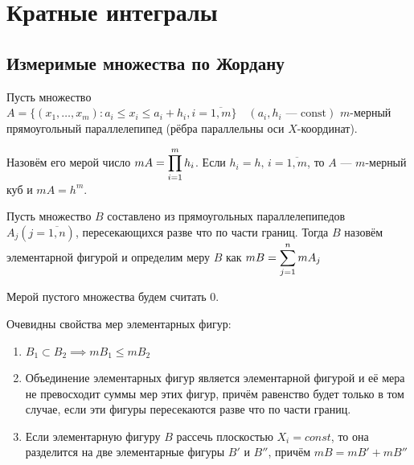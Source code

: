 \section{Кратные интегралы}

\subsection{Измеримые множества по Жордану}

\begin{definition}
    Пусть множество 
    $A = \{ (x_1, \dots, x_m): a_i \leq x_i \leq a_i + h_i, i = \overline{1, m} \}
    \quad (a_i, h_i \text{ --- const})$ $m$-мерный прямоугольный параллелепипед
    (рёбра параллельны оси $X$-координат).

    Назовём его мерой число $mA = \displaystyle\prod_{i = 1}^m h_i$.
    Если $h_i = h, \, i = \overline{1, m}$, то $A$ --- 
    $m$-мерный куб и $mA = h^m$.
\end{definition}

\begin{definition}
    Пусть множество $B$ составлено из прямоугольных параллелепипедов
    $A_j (j = \overline{1, n})$, пересекающихся разве что по части границ.
    Тогда $B$ назовём элементарной фигурой и определим меру $B$ как 
    $mB = \displaystyle\sum_{j = 1}^n m A_j$

    Мерой пустого множества будем считать 0.
\end{definition}

\begin{remark}
    Очевидны свойства мер элементарных фигур:

    \begin{enumerate}
        \item $B_1 \subset B_2 \implies mB_1 \leq mB_2$
        \item
            Объединение элементарных фигур является элементарной фигурой и её
            мера не превосходит суммы мер этих фигур, причём равенство будет
            только в том случае, если эти фигуры пересекаются разве что по
            части границ.
        \item
            Если элементарную фигуру $B$ рассечь плоскостью $X_i = const$, то
            она разделится на две элементарные фигуры $B'$ и $B''$, причём
            $mB = mB' + mB''$
    \end{enumerate}
\end{remark}

